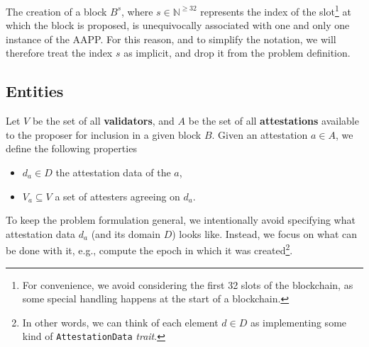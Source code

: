 \documentclass{article}
\begin{document}
\newcommand{\attestations}{\ensuremath{A}}
\newcommand{\solution}{\ensuremath{S}}
\newcommand{\attester}{\ensuremath{v}}
\newcommand{\attesters}[1]{\ensuremath{V_{#1}}}
\newcommand{\allattesters}{\ensuremath{V}}
\newcommand{\epoch}[1]{\ensuremath{e(#1)}}
\newcommand{\positives}{\ensuremath{\mathbb{N}^{>0}}}
\newcommand{\block}{\ensuremath{B}}
\newcommand{\attestation}{\ensuremath{a}}
\newcommand{\data}[1]{\ensuremath{d_{#1}}}
\newcommand{\Data}{\ensuremath{D}}
\newcommand{\epochs}{\ensuremath{E}}

The creation of a block $\block^{s}$, where $s \in \mathbb{N}^{\geq 32}$
represents the index of the slot\footnote{For convenience, we avoid considering
the first 32 slots of the blockchain, as some special handling happens at the
start of a blockchain.} at which the block is proposed, is unequivocally
associated with one and only one instance of the AAPP.  For this reason, and to
simplify the notation, we will therefore treat the index $s$ as implicit, and
drop it from the problem definition.

\subsection{Entities}

Let \allattesters{} be the set of all \textbf{validators}, and \attestations{}
be the set of all \textbf{attestations} available to the proposer for inclusion
in a given block \block. Given an attestation $\attestation \in \attestations$,
we define the following properties
%
\begin{itemize}
  \item $\data{\attestation} \in \Data$ the attestation data of the \attestation{},
  \item $\attesters{\attestation} \subseteq \allattesters$ a set of attesters
  agreeing on \data{\attestation}.
\end{itemize}
%
To keep the problem formulation general, we intentionally avoid specifying what
attestation data \data{\attestation} (and its domain \Data) looks like.
Instead, we focus on what can be done with it, e.g., compute the epoch in
which it was created\footnote{In other words, we can think of each element $d
\in \Data$ as implementing some kind of \texttt{AttestationData}
\emph{trait}.}.
\end{document}
